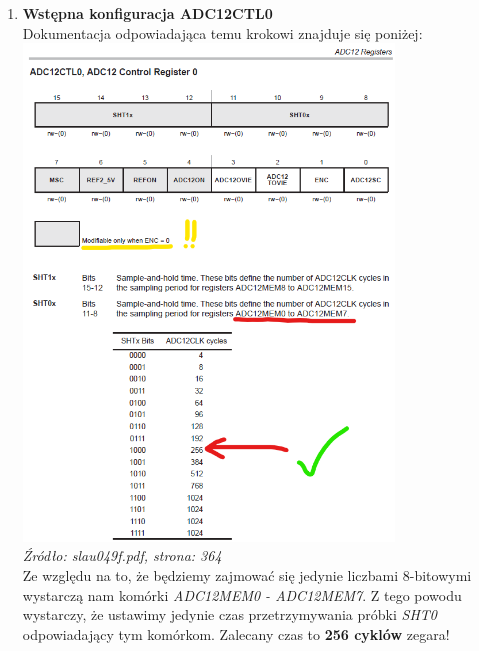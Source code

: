 \documentclass{article}
\begin{document}
\begin{enumerate}[label=\arabic*.]
    \item \textbf{Wstępna konfiguracja ADC12CTL0}
\vspace{3mm} \\
Dokumentacja odpowiadająca temu krokowi znajduje się poniżej: \\
\includegraphics[width=0.775\textwidth]{"../adc_img/slau049f_364.png"} \\
\textit{Źródło: slau049f.pdf, strona: 364}
\vspace{3mm} \\
Ze względu na to, że będziemy zajmować się jedynie liczbami 8-bitowymi wystarczą nam komórki \textit{ADC12MEM0 - ADC12MEM7}.
Z tego powodu wystarczy, że ustawimy jedynie czas przetrzymywania próbki \textit{SHT0} odpowiadający tym komórkom. Zalecany czas to \textbf{256 cyklów} zegara! \\
\vspace{3mm} \\

\end{enumerate}
\end{document}
